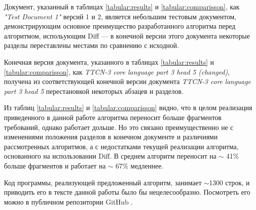 Документ, указанный в таблицах \ref{tabular:results} и \ref{tabular:comparisson}, как \emph{"Test Document 1"} версий 1 и 2, является небольшим тестовым документом, демонстрирующим основное преимущество разработанного алгоритма перед алгоритмом, испольующим Diff --- в конечной версии этого документа некоторые разделы переставлены местами по сравнению с исходной.

Конечная версия документа, указанного в таблицах \ref{tabular:results} и \ref{tabular:comparisson}, как \emph{TTCN-3 core language part 3 head 5 (changed)}, получена из соответствующей конечной версии документа \emph{TTCN-3 core language part 3 head 5} перестановкой некоторых абзацев и разделов.

Из таблиц \ref{tabular:results} и \ref{tabular:comparisson} видно, что в целом реализация приведенного в данной работе алгоритма переносит больше фрагментов требований, однако работает дольше. Но это связано преимущественно не с изменениями положения разделов в конечном документе и различиями рассмотренных алгоритмов, а с недостатками текущей реализации алгоритма, основанного на использовании Diff. В среднем алгоритм переносит на $\sim$ 41\% больше фрагментов и работает на $\sim$ 67\% медленнее.

Код программы, реализующей предложенный алгоритм, занимает $\sim$1300 строк, и приводить его в тексте данной работы было бы нецелесообразно. Посмотреть его можно в публичном репозитории GitHub \cite{web:github}. 